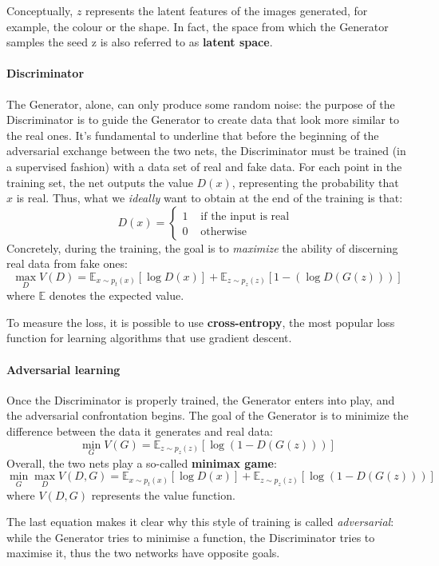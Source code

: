 \documentclass[12pt,a4paper]{book}
\theoremstyle{definition}
\begin{document}
	Conceptually, $z$ represents the latent features of the images generated, for example, the colour or the shape. In fact, the space from which the Generator samples the seed z is also referred to as \textbf{latent space}.
	\paragraph{Discriminator}
	The Generator, alone, can only produce some random noise: the purpose of the Discriminator is to guide the Generator to create data that look more similar to the real ones. It's fundamental to underline that before the beginning of the adversarial exchange between the two nets, the Discriminator must be trained (in a supervised fashion) with a data set of real and fake data.
	For each point in the training set, the net outputs the value $D(x)$, representing the probability that $x$ is real. Thus, what we \textit{ideally} want to obtain at the end of the training is that:
	\[
	D(x) = \begin{cases}
		1 &\text{ if the input is real }\\
		0 & \text{ otherwise }
	\end{cases}
	\]
	Concretely, during the training, the goal is to \textit{maximize} the ability of discerning real data from fake ones:
	\[
	\max_D V(D) = \mathbb{E}_{x\sim p_t(x)}[\log D(x)] + \mathbb{E}_{z\sim p_z(z)}[1-(\log D(G(z)))]
	\]
	where $\mathbb{E}$ denotes the expected value.
	
	To measure the loss, it is possible to use \textbf{cross-entropy}, the most popular loss function for learning algorithms that use gradient descent.
	\paragraph{Adversarial learning}
	Once the Discriminator is properly trained, the Generator enters into play, and the adversarial confrontation begins. The goal of the Generator is to minimize the difference between the data it generates and real data:
	\[
	\min_G V(G) = \mathbb{E}_{z\sim p_z(z)}[\log(1-D(G(z)))]
	\]
	Overall, the two nets play a so-called \textbf{minimax game}:
	\[
	\min_G \max_D V(D,G) = \mathbb{E}_{x\sim p_t(x)}[\log D(x)] + \mathbb{E}_{z\sim p_z(z)}[\log (1-D(G(z)))]
	\]
	where $V(D,G)$ represents the value function.
	
	The last equation makes it clear why this style of training is called \textit{adversarial}: while the Generator tries to minimise a function, the Discriminator tries to maximise it, thus the two networks have opposite goals.
	
\end{document}
